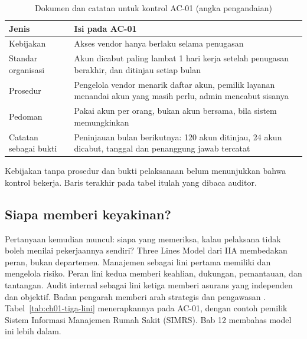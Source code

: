 \begin{table}[!htb]
  \centering\small
  \caption{Dokumen dan catatan untuk kontrol AC-01 (angka pengandaian)}
  \label{tab:ch01-dokumen}
  \begin{tabularx}{\textwidth}{|>{\raggedright\arraybackslash}p{}|>{\raggedright\arraybackslash}X|}
    \hline
    \textbf{Jenis} & \textbf{Isi pada AC-01} \\ \hline
    Kebijakan & Akses vendor hanya berlaku selama penugasan \\ \hline
    Standar organisasi & Akun dicabut paling lambat 1 hari kerja setelah penugasan berakhir,
    dan ditinjau setiap bulan \\ \hline
    Prosedur & Pengelola vendor menarik daftar akun, pemilik layanan menandai akun yang
    masih perlu, admin mencabut sisanya \\ \hline
    Pedoman & Pakai akun per orang, bukan akun bersama, bila sistem memungkinkan \\ \hline
    Catatan sebagai bukti & Peninjauan bulan berikutnya: 120 akun ditinjau, 24 akun dicabut,
    tanggal dan penanggung jawab tercatat \\ \hline
  \end{tabularx}
\end{table}

Kebijakan tanpa prosedur dan bukti pelaksanaan belum menunjukkan bahwa kontrol bekerja.
Baris terakhir pada tabel itulah yang dibaca auditor.

\subsection*{Siapa memberi keyakinan?}

Pertanyaan kemudian muncul: siapa yang memeriksa, kalau pelaksana tidak boleh menilai
pekerjaannya sendiri? Three Lines Model dari IIA membedakan peran, bukan departemen.
Manajemen sebagai lini pertama memiliki dan mengelola risiko. Peran lini kedua memberi
keahlian, dukungan, pemantauan, dan tantangan. Audit internal sebagai lini ketiga memberi
asurans yang independen dan objektif. Badan pengarah memberi arah strategis dan pengawasan
\cite{iia-tlm2026}. Tabel~\ref{tab:ch01-tiga-lini} menerapkannya pada AC-01, dengan contoh
pemilik Sistem Informasi Manajemen Rumah Sakit (SIMRS). Bab 12 membahas model ini lebih dalam.

